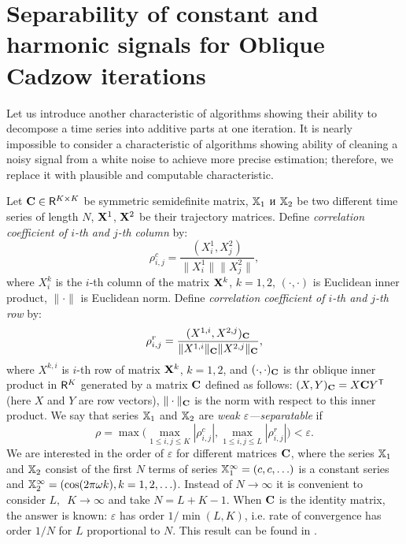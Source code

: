 \documentclass[sii]{ipart}
\begin{document}
\appendix

\section{Separability of constant and harmonic signals for Oblique Cadzow iterations}
\label{sec:app}

Let us introduce another characteristic of algorithms showing their ability to decompose a time series into additive parts at one iteration. It is nearly impossible to consider a characteristic of algorithms showing ability of cleaning a noisy signal from a white noise to achieve more precise estimation; therefore, we replace it with plausible and computable characteristic.

Let $\mathbf{C} \in \mathsf{R}^{K \times K}$ be symmetric semidefinite matrix, $\mathbb{X}_1$ и $\mathbb{X}_2$ be two different time series of length $N$, $\mathbf{X}^1$, $\mathbf{X}^2$ be their trajectory matrices. Define \emph{correlation coefficient of $i$-th and $j$-th column} by:
\begin{equation}\label{col_corr}
\rho^c_{i,j} = \frac{(X^1_i, X^2_j)}{\|X^1_i\| \|X^2_j\|},
\end{equation}
where $X^k_i$ is the $i$-th column of the matrix $\mathbf{X}^k$, $k = 1, 2$, $(\cdot, \cdot)$ is Euclidean inner product, $\|\cdot\|$ is Euclidean norm. Define \emph{correlation coefficient of $i$-th and $j$-th row} by:
\begin{equation}\label{row_corr}
\rho^r_{i,j} = \frac{(X^{1,i}, X^{2,j})_\bfC}{\|X^{1,i}\|_\bfC \|X^{2,j}\|_\bfC},
\end{equation}
where $X^{k,i}$ is $i$-th row of matrix $\mathbf{X}^k$, $k = 1, 2$, and $(\cdot, \cdot)_{\mathbf{C}}$ is thr oblique inner product in $\mathsf{R}^K$ generated by a matrix $\mathbf{C}$ defined as follows: $(X, Y)_{\mathbf{C}} = X \mathbf{C} Y^{\mathsf{T}}$ (here $X$ and $Y$ are row vectors), $\| \cdot \|_{\mathbf{C}}$ is the norm with respect to this inner product. We say that series $\mathbb{X}_1$ and $\mathbb{X}_2$ are \emph{weak $\varepsilon$---separatable} if
\begin{equation}\label{weak_sep_eq}
\rho = \max\Big(\max_{1 \le i,j \le K}|\rho^c_{i,j}|, \max_{1 \le i,j \le L}|\rho^r_{i,j}|\Big) < \varepsilon.
\end{equation}
We are interested in the order of $\varepsilon$ for different matrices $\mathbf{C}$, where the series $\mathbb{X}_1$ and $\mathbb{X}_2$ consist of the first $N$ terms of series $\mathbb{X}_1^\infty = (c, c, \ldots)$ is a constant series and $\mathbb{X}_2^\infty = (\cos(2 \pi \omega k), k = 1, 2, \ldots)$. Instead of $N \to \infty$ it is convenient to consider $L,$~$K \to \infty$ and take $N = L + K - 1$. When $\mathbf{C}$ is the identity matrix, the answer is known: $\varepsilon$ has order $1/\min(L,K)$, i.e. rate of convergence has order $1/N$ for $L$ proportional to $N$.
This result can be found in \cite[Chapter 6.1]{Golyandina.etal2001}. %
\end{document}
